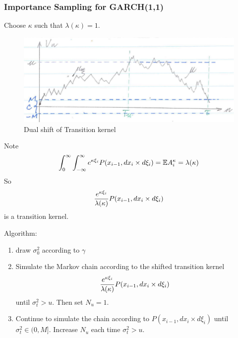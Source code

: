 \documentclass{beamer}
\begin{document}
\begin{frame}
  \frametitle{Importance Sampling for GARCH(1,1)}
  Choose $\kappa$ such that $\lambda(\kappa) = 1$.
  \begin{minipage}[t]{0.55\linewidth}
    \begin{figure}
      \centering
      \includegraphics[width=1.0\linewidth]{pic1.pdf}
      \caption{Dual shift of Transition kernel}
      \label{fig:dual_measure}
    \end{figure}
    \begin{scriptsize}
      Note
      \[
      \int_0^\infty \int_{-\infty}^{\infty}
      e^{\kappa \xi_i}
      P(x_{i-1}, d x_{i} \times d\xi_{i})
      = \mathbb{E} A_i^\kappa = \lambda(\kappa)
      \]
      So
      \[
      {e^{\kappa \xi_i} \over \lambda(\kappa)}
      P(x_{i-1}, d x_{i} \times d\xi_{i})
      \]
      is a transition kernel.
    \end{scriptsize}
  \end{minipage}\hfill
  \begin{minipage}[t]{0.4\linewidth}
    \begin{scriptsize}
      Algorithm:
      \begin{enumerate}
      \item draw $\sigma_0^2$ according to $\gamma$
      \item Simulate the Markov chain according to the shifted transition
        kernel
        \[
        {e^{\kappa \xi_i} \over \lambda(\kappa)}
        P(x_{i-1}, d x_{i} \times d\xi_{i})
        \]
        until $\sigma_t^2 > u$. Then set $N_u = 1$.
      \item Continue to simulate the chain according to $P(x_{i-1}, d
        x_{i} \times d\xi_{i})$ until $\sigma_t^2 \in (0, M]$. Increase $N_u$
        each time $\sigma_t^2 > u$.
      \end{enumerate}
    \end{scriptsize}
  \end{minipage}
\end{frame}
\end{document}
